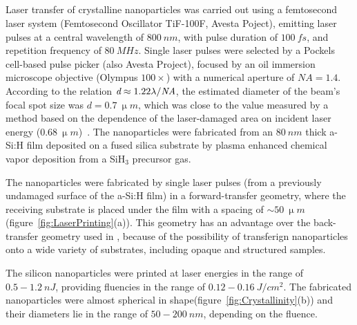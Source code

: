     \subsection{}

    \subsection{}
            Laser transfer of crystalline nanoparticles was carried out using a femtosecond laser system
        (Femtosecond Oscillator TiF-100F, Avesta Poject), emitting laser pulses at a central wavelength of $800~\si{nm}$,
        with pulse duration of $100~\si{fs}$, and repetition frequency of $80~\si{MHz}$. Single laser pulses were selected
        by a Pockels cell-based pulse picker (also Avesta Project), focused by an oil immersion microscope objective (Olympus $100\times$)
        with a numerical aperture of $\mathit{NA}=1.4$. According to the relation $\emph{d}\approx 1.22\lambda/\mathit{NA}$, the estimated
        diameter of the beam's focal spot size was $d=0.7~\si{\upmu m}$, which was close to the value measured by a method based on
        the dependence of the laser-damaged area on incident laser energy ($0.68~\si{\upmu m}$)~\cite{liu1982simple}.
        The nanoparticles were fabricated from an $80~\si{nm}$ thick a-Si:H film deposited on a fused silica substrate by
        plasma enhanced chemical vapor deposition from a SiH$_{3}$ precursor gas.

            The nanoparticles were fabricated by single laser pulses (from a previously undamaged surface of the a-Si:H film) in a
        forward-transfer geometry, where the receiving substrate is placed under the film with a spacing
        of $\sim 50~\si{\upmu m}$ (figure~\ref{fig:LaserPrinting}(a)). This geometry has an advantage over the back-transfer geometry
        used in \cite{zywietz2014laser}, because of the possibility of transferign nanoparticles onto a wide variety of substrates,
        including opaque and structured samples.

            The silicon nanoparticles were printed at laser energies in the range of $0.5-1.2~\si{nJ}$, providing fluencies in
        the range of $0.12-0.16~\si{J/cm^{2}}$. The fabricated nanoparticles were almost spherical in shape(figure~\ref{fig:Crystallinity}(b))
        and their diameters lie in the range of $50-200~\si{nm}$, depending on the fluence.

